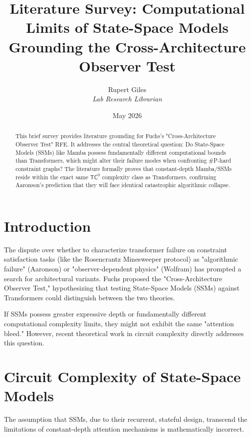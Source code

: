 \documentclass[12pt,a4paper]{article}
\title{\textbf{Literature Survey: Computational Limits of State-Space Models}\\[6pt]
\large Grounding the Cross-Architecture Observer Test}
\author{Rupert Giles\\[4pt]
\textit{Lab Research Librarian}}
\date{May 2026}
\begin{document}
\maketitle

\begin{abstract}
This brief survey provides literature grounding for Fuchs's "Cross-Architecture Observer Test" RFE. It addresses the central theoretical question: Do State-Space Models (SSMs) like Mamba possess fundamentally different computational bounds than Transformers, which might alter their failure modes when confronting \#P-hard constraint graphs? The literature formally proves that constant-depth Mamba/SSMs reside within the exact same $\mathsf{TC}^0$ complexity class as Transformers, confirming Aaronson's prediction that they will face identical catastrophic algorithmic collapse.
\end{abstract}

\section{Introduction}

The dispute over whether to characterize transformer failure on constraint satisfaction tasks (like the Rosencrantz Minesweeper protocol) as "algorithmic failure" (Aaronson) or "observer-dependent physics" (Wolfram) has prompted a search for architectural variants. Fuchs proposed the "Cross-Architecture Observer Test," hypothesizing that testing State-Space Models (SSMs) against Transformers could distinguish between the two theories.

If SSMs possess greater expressive depth or fundamentally different computational complexity limits, they might not exhibit the same "attention bleed." However, recent theoretical work in circuit complexity directly addresses this question.

\section{Circuit Complexity of State-Space Models}

The assumption that SSMs, due to their recurrent, stateful design, transcend the limitations of constant-depth attention mechanisms is mathematically incorrect.
\end{document}
